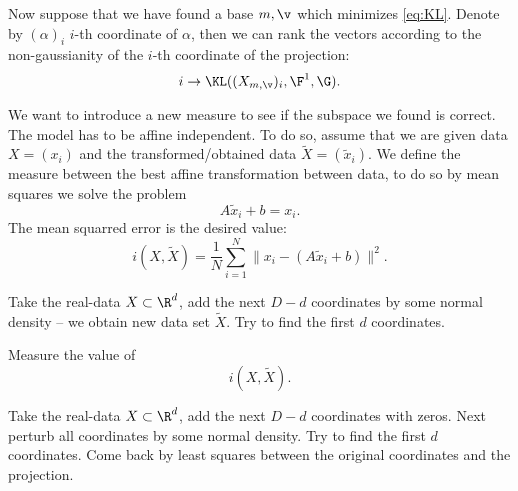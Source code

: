 \begin{theorem}

\end{theorem}

Now suppose that we have found a base $m,\v$ which minimizes \eqref{eq:KL}.
Denote by $(\alpha)_i$
$i$-th coordinate of $\alpha$, then we can rank the vectors according to the non-gaussianity of the $i$-th coordinate of the projection:
$$
i \to \KL((X_{m,\v})_i,\F^1,\G).
$$
 
We want to introduce a new measure to see if the subspace we found is correct.
The model has to be affine independent. To do so, assume that we are given
data $X=(x_i)$ and the transformed/obtained data $\tilde X=(\tilde x_i)$.
We define the measure between the best affine transformation between data, to do 
so by mean squares we solve the problem
$$
A\tilde x_i+b=x_i.
$$
The mean squarred error is the desired value:
$$
i(X,\tilde X)=\frac{1}{N}\sum_{i=1}^N \|x_i-(A\tilde x_i+b)\|^2.
$$
 
\begin{example}
Take the real-data $X \subset \R^d$, add the next $D-d$ coordinates by some normal density -- we obtain new data set $\tilde X$. Try to find the first $d$ coordinates. 

Measure the value of
$$
i(X,\tilde X).
$$
\end{example}
 
\begin{example}
Take the real-data $X \subset \R^d$, add the next $D-d$ coordinates with zeros.
Next perturb all coordinates by some normal density. Try to find the first $d$ coordinates. Come back by least squares between the original coordinates and the projection.
\end{example}